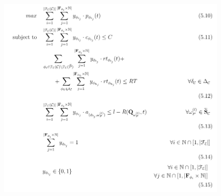 \documentclass[13.5pt]{beamer}
\begin{document}

\begin{frame}
	
\begin{figure}[h]
	\centering
	\includegraphics[width=\textwidth,height=0.8\columnwidth]{../Images/MMKPForSlide.png}
\end{figure}
	
	
\end{frame}
\end{document}
